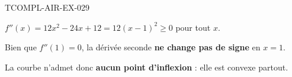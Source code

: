 \begin{corrige}{TCOMPL-AIR-EX-029}

$f''(x) = 12x^2 - 24x + 12 = 12(x-1)^2 \geq 0$ pour tout $x$.


Bien que $f''(1) = 0$, la dérivée seconde \textbf{ne change pas de signe} en $x=1$.

La courbe n'admet donc \textbf{aucun point d'inflexion} : elle est convexe partout.

\end{corrige}
